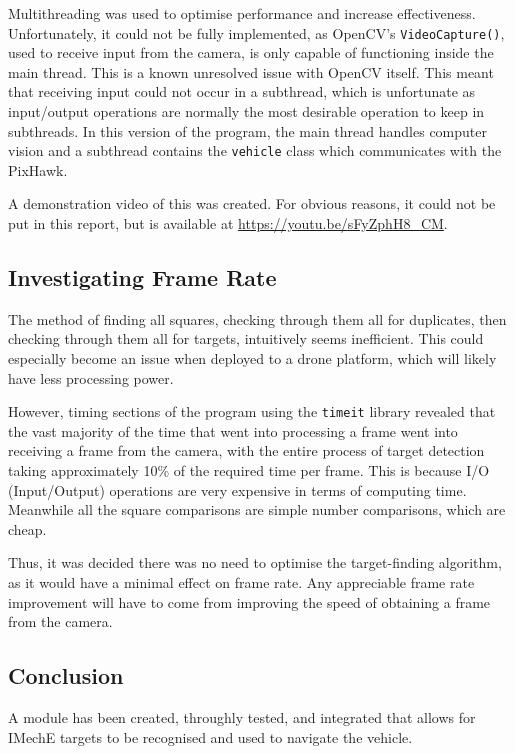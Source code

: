 \documentclass[11pt]{article}
\begin{document}
Multithreading was used to optimise performance and increase effectiveness. Unfortunately, it could not be fully implemented, as OpenCV's \lstinline|VideoCapture()|, used to receive input from the camera, is only capable of functioning inside the main thread. This is a known unresolved issue with OpenCV itself. This meant that receiving input could not occur in a subthread, which is unfortunate as input/output operations are normally the most desirable operation to keep in subthreads. In this version of the program, the main thread handles computer vision and a subthread contains the \lstinline|vehicle| class which communicates with the PixHawk. \label{OpenCV_multithreading_issues}

A demonstration video of this was created. For obvious reasons, it could not be put in this report, but is available at \url{https://youtu.be/sFyZphH8_CM}.

\subsection{Investigating Frame Rate}
The method of finding all squares, checking through them all for duplicates, then checking through them all for targets, intuitively seems inefficient. This could especially become an issue when deployed to a drone platform, which will likely have less processing power.

However, timing sections of the program using the \lstinline|timeit| library revealed that the vast majority of the time that went into processing a frame went into receiving a frame from the camera, with the entire process of target detection taking approximately 10\% of the required time per frame. This is because I/O (Input/Output) operations are very expensive in terms of computing time. Meanwhile all the square comparisons are simple number comparisons, which are cheap.

Thus, it was decided there was no need to optimise the target-finding algorithm, as it would have a minimal effect on frame rate. Any appreciable frame rate improvement will have to come from improving the speed of obtaining a frame from the camera.

\subsection{Conclusion}
A module has been created, throughly tested, and integrated that allows for IMechE targets to be recognised and used to navigate the vehicle.
\end{document}
